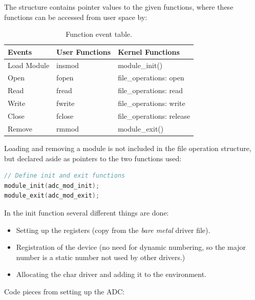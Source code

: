The structure contains pointer values to the given functions, where these functions can be accessed from user space by:
\begin{table}[H]
	\centering
	\begin{tabular}{|l|l|l|}
		\hline
			Events		& User Functions & Kernel Functions \\ \hline
			Load Module 	& insmod	& module\_init()		 \\ 
			Open		& fopen	& file\_operations: open	 \\ 
			Read		& fread	& file\_operations: read	 \\ 
			Write			& fwrite 	& file\_operations: write	 \\ 
			Close		& fclose 	& file\_operations: release\\ 
			Remove		& rmmod 	& module\_exit()		 \\
		\hline
	\end{tabular}
	\caption{Function event table.}
\end{table}
Loading and removing a module is not included in the file operation structure, but declared aside as pointers to the two functions used:
\begin{lstlisting}[language=c]
// Define init and exit functions
module_init(adc_mod_init);
module_exit(adc_mod_exit);
\end{lstlisting}

In the init function several different things are done:
\begin{itemize}
	\item Setting up the registers (copy from the \textit{bare metal} driver file).
	\item Registration of the device (no need for dynamic numbering, so the major number is a static number not used by other drivers.)
	\item Allocating the char driver and adding it to the environment.
\end{itemize}

Code pieces from setting up the ADC:

